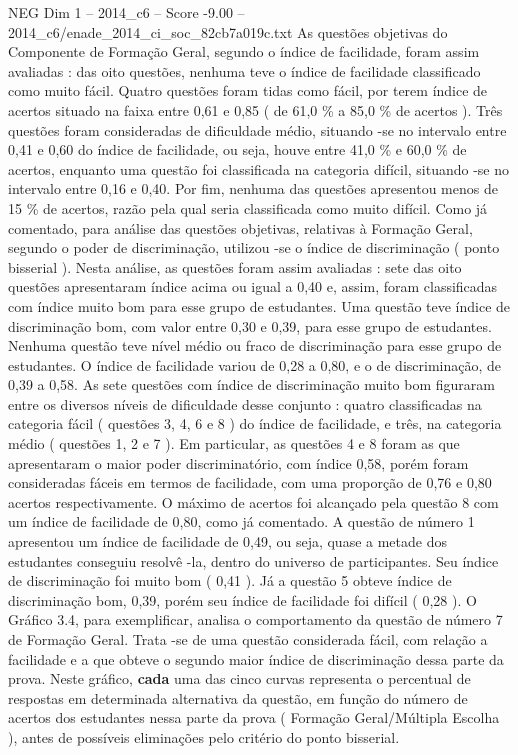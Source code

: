 \begin{textsample}{NEG Dim 1 – 2014\_c6 – Score -9.00 – 2014\_c6/enade\_2014\_ci\_soc\_82cb7a019c.txt}
As questões objetivas do Componente de Formação Geral, segundo o índice de facilidade, foram assim avaliadas : das oito questões, nenhuma teve o índice de facilidade classificado como muito fácil.
Quatro questões foram tidas como fácil, por terem índice de acertos situado na faixa entre 0,61 e 0,85 ( de 61,0 \% a 85,0 \% de acertos ).
Três questões foram consideradas de dificuldade médio, situando -se no intervalo entre 0,41 e 0,60 do índice de facilidade, ou seja, houve entre 41,0 \% e 60,0 \% de acertos, enquanto uma questão foi classificada na categoria difícil, situando -se no intervalo entre 0,16 e 0,40.
Por fim, nenhuma das questões apresentou menos de 15 \% de acertos, razão pela qual seria classificada como muito difícil.
Como já comentado, para análise das questões objetivas, relativas à Formação Geral, segundo o poder de discriminação, utilizou -se o índice de discriminação ( ponto bisserial ).
Nesta análise, as questões foram assim avaliadas : sete das oito questões apresentaram índice acima ou igual a 0,40 e, assim, foram classificadas com índice muito bom para esse grupo de estudantes.
Uma questão teve índice de discriminação bom, com valor entre 0,30 e 0,39, para esse grupo de estudantes.
Nenhuma questão teve nível médio ou fraco de discriminação para esse grupo de estudantes.
O índice de facilidade variou de 0,28 a 0,80, e o de discriminação, de 0,39 a 0,58.
As sete questões com índice de discriminação muito bom figuraram entre os diversos níveis de dificuldade desse conjunto : quatro classificadas na categoria fácil ( questões 3, 4, 6 e 8 ) do índice de facilidade, e três, na categoria médio ( questões 1, 2 e 7 ).
Em particular, as questões 4 e 8 foram as que apresentaram o maior poder discriminatório, com índice 0,58, porém foram consideradas fáceis em termos de facilidade, com uma proporção de 0,76 e 0,80 acertos respectivamente.
O máximo de acertos foi alcançado pela questão 8 com um índice de facilidade de 0,80, como já comentado.
A questão de número 1 apresentou um índice de facilidade de 0,49, ou seja, quase a metade dos estudantes conseguiu resolvê -la, dentro do universo de participantes.
Seu índice de discriminação foi muito bom ( 0,41 ).
Já a questão 5 obteve índice de discriminação bom, 0,39, porém seu índice de facilidade foi difícil ( 0,28 ).
O Gráfico 3.4, para exemplificar, analisa o comportamento da questão de número 7 de Formação Geral.
Trata -se de uma questão considerada fácil, com relação a facilidade e a que obteve o segundo maior índice de discriminação dessa parte da prova.
Neste gráfico, \textbf{cada} uma das cinco curvas representa o percentual de respostas em determinada alternativa da questão, em função do número de acertos dos estudantes nessa parte da prova ( Formação Geral/Múltipla Escolha ), antes de possíveis eliminações pelo critério do ponto bisserial.

\end{textsample}
